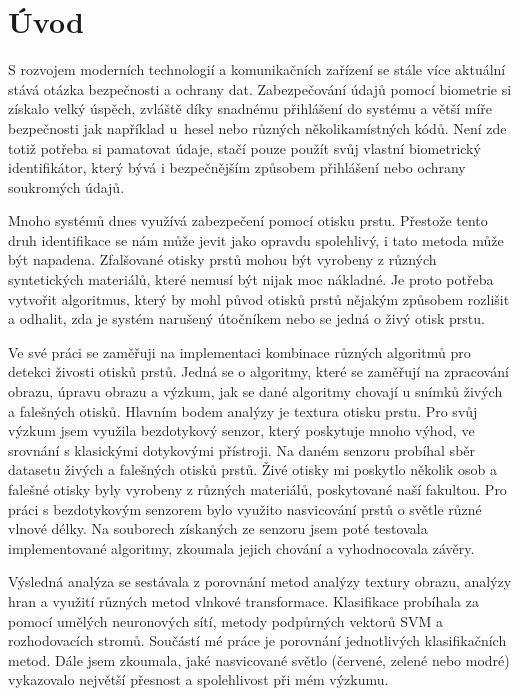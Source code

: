 \chapter{Úvod}
S rozvojem moderních technologií a komunikačních zařízení se stále více aktuální stává otázka bezpečnosti a ochrany dat. Zabezpečování údajů pomocí biometrie si získalo velký úspěch, zvláště díky snadnému přihlášení do systému a větší míře bezpečnosti jak například u~hesel nebo různých několikamístných kódů. Není zde totiž potřeba si pamatovat údaje, stačí pouze použít svůj vlastní biometrický identifikátor, který bývá i bezpečnějším způsobem přihlášení nebo ochrany soukromých údajů. 

Mnoho systémů dnes využívá zabezpečení pomocí otisku prstu. Přestože tento druh identifikace se nám může jevit jako opravdu spolehlivý, i tato metoda může být napadena. Zfalšované otisky prstů mohou být vyrobeny z různých syntetických materiálů, které nemusí být nijak moc nákladné. Je proto potřeba vytvořit algoritmus, který by mohl původ otisků prstů nějakým způsobem rozlišit a odhalit, zda je systém narušený útočníkem nebo se jedná o živý otisk prstu.

Ve své práci se zaměřuji na implementaci kombinace různých algoritmů pro detekci živosti otisků prstů. Jedná se o algoritmy, které se zaměřují na zpracování obrazu, úpravu obrazu a výzkum, jak se dané algoritmy chovají u snímků živých a falešných otisků. Hlavním bodem analýzy je textura otisku prstu. Pro svůj výzkum jsem využila bezdotykový senzor, který poskytuje mnoho výhod, ve srovnání s klasickými dotykovými přístroji. Na daném senzoru probíhal sběr datasetu živých a falešných otisků prstů. Živé otisky mi poskytlo několik osob a falešné otisky byly vyrobeny z různých materiálů, poskytované naší fakultou. Pro práci s bezdotykovým senzorem bylo využito nasvicování prstů o světle různé vlnové délky. Na souborech získaných ze senzoru jsem poté testovala implementované algoritmy, zkoumala jejich chování a vyhodnocovala závěry.

Výsledná analýza se sestávala z porovnání metod analýzy textury obrazu, analýzy hran a využití různých metod vlnkové transformace. Klasifikace probíhala za pomocí umělých neuronových sítí, metody podpůrných vektorů SVM a rozhodovacích stromů. Součástí mé práce je porovnání jednotlivých klasifikačních metod. Dále jsem zkoumala, jaké nasvicované světlo (červené, zelené nebo modré) vykazovalo největší přesnost a spolehlivost při mém výzkumu. 

